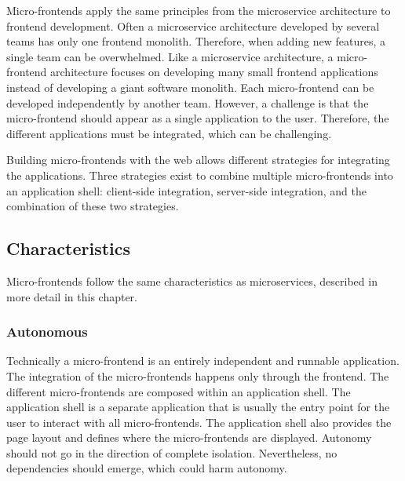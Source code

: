 \bigskip

\noindent Micro-frontends apply the same principles from the microservice architecture to frontend development. Often a microservice architecture developed by several teams has only one frontend monolith. Therefore, when adding new features, a single team can be overwhelmed. Like a microservice architecture, a micro-frontend architecture focuses on developing many small frontend applications instead of developing a giant software monolith. Each micro-frontend can be developed independently by another team. However, a challenge is that the micro-frontend should appear as a single application to the user. Therefore, the different applications must be integrated, which can be challenging.

\bigskip

\noindent Building micro-frontends with the web allows different strategies for integrating the applications. Three strategies exist to combine multiple micro-frontends into an application shell: client-side integration, server-side integration, and the combination of these two strategies. \cite[10-12]{book:2020:geers:background:micro-frontends:micro-frontends-in-action}

\subsection{Characteristics}\label{subsection:background:micro-frontend-characteristics}

Micro-frontends follow the same characteristics as microservices, described in more detail in this chapter.

\subsubsection{Autonomous}\label{subsubsection:background:micro-frontend-autonomous}

Technically a micro-frontend is an entirely independent and runnable application. The integration of the micro-frontends happens only through the frontend. The different micro-frontends are composed within an application shell. The application shell is a separate application that is usually the entry point for the user to interact with all micro-frontends. The application shell also provides the page layout and defines where the micro-frontends are displayed. Autonomy should not go in the direction of complete isolation. Nevertheless, no dependencies should emerge, which could harm autonomy. \cite{book:2020:geers:background:micro-frontends:micro-frontends-in-action}

